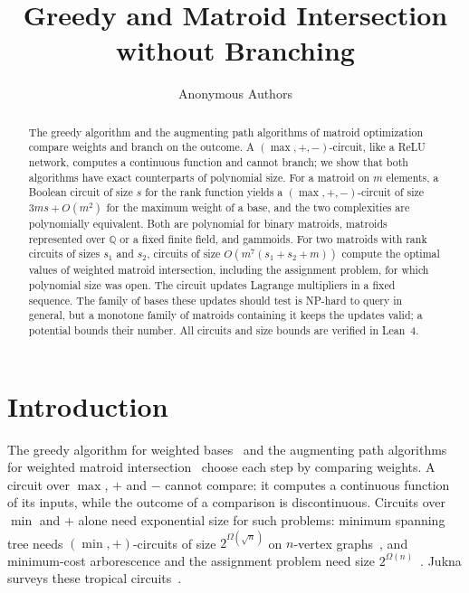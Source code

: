 \documentclass[runningheads,envcountsame]{llncs}
\begin{document}
\title{Greedy and Matroid Intersection\texorpdfstring{\\}{ }without Branching}
\author{Anonymous Authors}

\maketitle

\begin{abstract}
The greedy algorithm and the augmenting path algorithms of matroid optimization
compare weights and branch on the outcome.  A $(\max,+,-)$-circuit, like a ReLU
network, computes a continuous function and cannot branch; we show that both
algorithms have exact counterparts of polynomial size.  For a matroid on $m$
elements, a Boolean circuit of size $s$ for the rank function yields a
$(\max,+,-)$-circuit of size $3ms+O(m^{2})$ for the maximum weight of a base, and
the two complexities are polynomially equivalent.  Both are polynomial for binary
matroids, matroids represented over $\mathbb Q$ or a fixed finite field, and
gammoids.  For two matroids with rank circuits of sizes $s_1$ and $s_2$, circuits
of size $O(m^{7}(s_1+s_2+m))$ compute the optimal values of weighted matroid
intersection, including the assignment problem, for which polynomial size was
open.  The circuit updates Lagrange multipliers in a fixed sequence.  The family
of bases these updates should test is NP-hard to query in general, but a
monotone family of matroids containing it keeps the updates valid; a potential
bounds their number.  All circuits and size bounds are verified in Lean~4.
\end{abstract}

\section{Introduction}
\label{sec:intro}

The greedy algorithm for weighted bases~\cite{edmonds71} and the augmenting path
algorithms for weighted matroid intersection~\cite{edmonds70,lawler75,frank81}
choose each step by comparing weights.  A circuit over $\max$, $+$ and $-$ cannot
compare: it computes a continuous function of its inputs, while the outcome of a
comparison is discontinuous.  Circuits over $\min$ and $+$ alone need exponential
size for such problems: minimum spanning tree needs
$(\min,+)$-circuits of size $2^{\Omega(\sqrt n)}$ on $n$-vertex
graphs~\cite{jukna-seiwert18-greedy}, and minimum-cost arborescence and the
assignment problem need size $2^{\Omega(n)}$~\cite{jerrum-snir82}.  Jukna surveys these
tropical circuits~\cite{jukna15-tropical,jukna23-tropical}.
\end{document}
